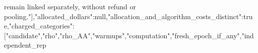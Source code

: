 \documentclass[10pt]{article}
\begin{document}
\allowbreak{}r\allowbreak{}e\allowbreak{}m\allowbreak{}a\allowbreak{}i\allowbreak{}n\allowbreak{} \allowbreak{}l\allowbreak{}i\allowbreak{}n\allowbreak{}k\allowbreak{}e\allowbreak{}d\allowbreak{} \allowbreak{}s\allowbreak{}e\allowbreak{}p\allowbreak{}a\allowbreak{}r\allowbreak{}a\allowbreak{}t\allowbreak{}e\allowbreak{}l\allowbreak{}y\allowbreak{},\allowbreak{} \allowbreak{}w\allowbreak{}i\allowbreak{}t\allowbreak{}h\allowbreak{}o\allowbreak{}u\allowbreak{}t\allowbreak{} \allowbreak{}r\allowbreak{}e\allowbreak{}f\allowbreak{}u\allowbreak{}n\allowbreak{}d\allowbreak{} \allowbreak{}o\allowbreak{}r\allowbreak{} \allowbreak{}p\allowbreak{}o\allowbreak{}o\allowbreak{}l\allowbreak{}i\allowbreak{}n\allowbreak{}g\allowbreak{}.\allowbreak{}"\allowbreak{}]\allowbreak{},\allowbreak{}"\allowbreak{}a\allowbreak{}l\allowbreak{}l\allowbreak{}o\allowbreak{}c\allowbreak{}a\allowbreak{}t\allowbreak{}e\allowbreak{}d\allowbreak{}\_\allowbreak{}d\allowbreak{}o\allowbreak{}l\allowbreak{}l\allowbreak{}a\allowbreak{}r\allowbreak{}s\allowbreak{}"\allowbreak{}:\allowbreak{}n\allowbreak{}u\allowbreak{}l\allowbreak{}l\allowbreak{},\allowbreak{}"\allowbreak{}a\allowbreak{}l\allowbreak{}l\allowbreak{}o\allowbreak{}c\allowbreak{}a\allowbreak{}t\allowbreak{}i\allowbreak{}o\allowbreak{}n\allowbreak{}\_\allowbreak{}a\allowbreak{}n\allowbreak{}d\allowbreak{}\_\allowbreak{}a\allowbreak{}l\allowbreak{}g\allowbreak{}o\allowbreak{}r\allowbreak{}i\allowbreak{}t\allowbreak{}h\allowbreak{}m\allowbreak{}\_\allowbreak{}c\allowbreak{}o\allowbreak{}s\allowbreak{}t\allowbreak{}s\allowbreak{}\_\allowbreak{}d\allowbreak{}i\allowbreak{}s\allowbreak{}t\allowbreak{}i\allowbreak{}n\allowbreak{}c\allowbreak{}t\allowbreak{}"\allowbreak{}:\allowbreak{}t\allowbreak{}r\allowbreak{}u\allowbreak{}e\allowbreak{},\allowbreak{}"\allowbreak{}c\allowbreak{}h\allowbreak{}a\allowbreak{}r\allowbreak{}g\allowbreak{}e\allowbreak{}d\allowbreak{}\_\allowbreak{}c\allowbreak{}a\allowbreak{}t\allowbreak{}e\allowbreak{}g\allowbreak{}o\allowbreak{}r\allowbreak{}i\allowbreak{}e\allowbreak{}s\allowbreak{}"\allowbreak{}:\allowbreak{}[\allowbreak{}"\allowbreak{}c\allowbreak{}a\allowbreak{}n\allowbreak{}d\allowbreak{}i\allowbreak{}d\allowbreak{}a\allowbreak{}t\allowbreak{}e\allowbreak{}"\allowbreak{},\allowbreak{}"\allowbreak{}r\allowbreak{}h\allowbreak{}o\allowbreak{}"\allowbreak{},\allowbreak{}"\allowbreak{}r\allowbreak{}h\allowbreak{}o\allowbreak{}\_\allowbreak{}A\allowbreak{}A\allowbreak{}"\allowbreak{},\allowbreak{}"\allowbreak{}w\allowbreak{}a\allowbreak{}r\allowbreak{}m\allowbreak{}u\allowbreak{}p\allowbreak{}s\allowbreak{}"\allowbreak{},\allowbreak{}"\allowbreak{}c\allowbreak{}o\allowbreak{}m\allowbreak{}p\allowbreak{}u\allowbreak{}t\allowbreak{}a\allowbreak{}t\allowbreak{}i\allowbreak{}o\allowbreak{}n\allowbreak{}"\allowbreak{},\allowbreak{}"\allowbreak{}f\allowbreak{}r\allowbreak{}e\allowbreak{}s\allowbreak{}h\allowbreak{}\_\allowbreak{}e\allowbreak{}p\allowbreak{}o\allowbreak{}c\allowbreak{}h\allowbreak{}\_\allowbreak{}i\allowbreak{}f\allowbreak{}\_\allowbreak{}a\allowbreak{}n\allowbreak{}y\allowbreak{}"\allowbreak{},\allowbreak{}"\allowbreak{}i\allowbreak{}n\allowbreak{}d\allowbreak{}e\allowbreak{}p\allowbreak{}e\allowbreak{}n\allowbreak{}d\allowbreak{}e\allowbreak{}n\allowbreak{}t\allowbreak{}\_\allowbreak{}r\allowbreak{}e\allowbreak{}p\allowb
\end{document}

